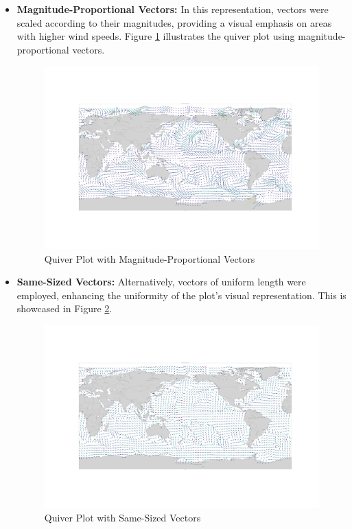 \documentclass[conference]{IEEEtran}
\begin{document}
\begin{itemize}
  \item \textbf{Magnitude-Proportional Vectors:} In this representation, vectors were scaled according to their magnitudes, providing a visual emphasis on areas with higher wind speeds. Figure \ref{fig:magnitude_proportional} illustrates the quiver plot using magnitude-proportional vectors.

  \begin{figure}[h]
    \centering
    \includegraphics[width=0.7\linewidth]{images_ricky/quiver_plot_different.png}
    \caption{Quiver Plot with Magnitude-Proportional Vectors}
    \label{fig:magnitude_proportional}
  \end{figure}

  \item \textbf{Same-Sized Vectors:} Alternatively, vectors of uniform length were employed, enhancing the uniformity of the plot's visual representation. This is showcased in Figure \ref{fig:same_sized_vectors}.

  \begin{figure}[h]
    \centering
    \includegraphics[width=0.7\linewidth]{images_ricky/quiver_plot_same.png}
    \caption{Quiver Plot with Same-Sized Vectors}
    \label{fig:same_sized_vectors}
  \end{figure}

\end{itemize}
\end{document}
